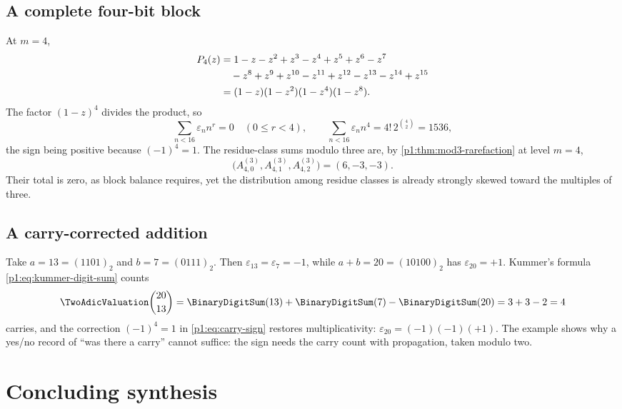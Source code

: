 \documentclass[11pt,oneside]{article}
\numberwithin{equation}{section}
\theoremstyle{definition}
\theoremstyle{remark}
\newcommand{\eps}{\varepsilon}
\begin{document}
\subsection{A complete four-bit block}

At \(m=4\),
\begin{align}
  P_4(z)
  &=1-z-z^2+z^3-z^4+z^5+z^6-z^7
  \notag\\
  &\quad{}-z^8+z^9+z^{10}-z^{11}+z^{12}-z^{13}-z^{14}+z^{15}
  \notag\\
  &=(1-z)(1-z^2)(1-z^4)(1-z^8).
  \label{p1:eq:P4-example}
\end{align}
The factor \((1-z)^4\) divides the product, so
\begin{equation}
  \sum_{n<16}\eps_nn^r=0
  \quad(0\le r<4),
  \qquad
  \sum_{n<16}\eps_nn^4=4!\,2^{\binom42}=1536,
  \label{p1:eq:P4-moments}
\end{equation}
the sign being positive because \((-1)^4=1\).  The residue-class sums modulo
three are, by \cref{p1:thm:mod3-rarefaction} at level \(m=4\),
\begin{equation}
  \bigl(A^{(3)}_{4,0},A^{(3)}_{4,1},A^{(3)}_{4,2}\bigr)=(6,-3,-3).
  \label{p1:eq:P4-rarefied}
\end{equation}
Their total is zero, as block balance requires, yet the distribution among
residue classes is already strongly skewed toward the multiples of three.

\subsection{A carry-corrected addition}

Take \(a=13=(1101)_2\) and \(b=7=(0111)_2\).  Then
\(\eps_{13}=\eps_7=-1\), while \(a+b=20=(10100)_2\) has
\(\eps_{20}=+1\).  Kummer's formula \eqref{p1:eq:kummer-digit-sum} counts
\begin{equation}
  \TwoAdicValuation\binom{20}{13}=\BinaryDigitSum(13)+\BinaryDigitSum(7)-\BinaryDigitSum(20)=3+3-2=4
  \label{p1:eq:carry-example}
\end{equation}
carries, and the correction \((-1)^4=1\) in \eqref{p1:eq:carry-sign} restores
multiplicativity: \(\eps_{20}=(-1)(-1)(+1)\).  The example shows why a
yes/no record of ``was there a carry'' cannot suffice: the sign needs the
carry count with propagation, taken modulo two.

\section[Conclusion]{Concluding synthesis}
\label{p1:sec:conclusion}
\end{document}
